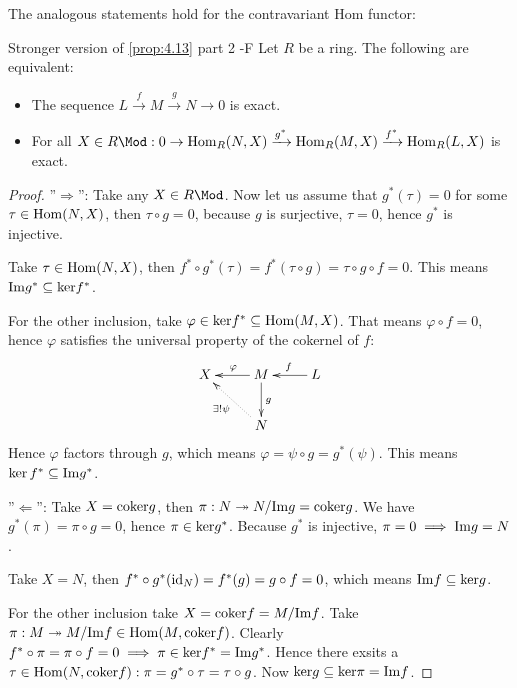 \documentclass[twoside = false,	%
		headsepline,		%
		parskip = true,
		]{scrbook}						%
\begin{document}
        The analogous statements hold for the contravariant Hom functor:
        \begin{proposition*}{Stronger version of \ref{prop:4.13} part 2 -F}
            Let $R$ be a ring. The following are equivalent:
            \begin{itemize}
                \item The sequence $L \xrightarrow{f} M \xrightarrow{g} N \to 0$ is exact.
                \item For all $X \in R \Mod: 0 \to \Hom_R(N,X) \xrightarrow{g^*} \Hom_R(M,X) \xrightarrow{f^*} \Hom_R(L,X)$ is exact.
            \end{itemize}
        \end{proposition*}

        \begin{proof}
        ''$\Rightarrow$'': Take any $X \in R\Mod$. Now let us assume that $g^*(\tau) = 0$ for some $\tau \in \mathrm{Hom}(N,X)$,
        then $\tau \circ g = 0$, because $g$ is surjective, $\tau = 0$, hence $g^*$ is injective.

        Take $\tau \in \mathrm{Hom}(N,X)$, then $f^* \circ g^* (\tau) = f^*(\tau \circ g) = \tau \circ g \circ f = 0$.
        This means $\mathrm{Im} g^* \subseteq \mathrm{ker} f^*$.

        For the other inclusion, take $\varphi \in \mathrm{ker} f^* \subseteq \mathrm{Hom}(M,X)$. That means $\varphi \circ f = 0$,
        hence $\varphi$ satisfies the universal property of the cokernel of $f$:
        \begin{equation*}
        \xymatrix {
            X & M \ar[l]_{\varphi} \ar[d]^{g} & \ar[l]_{f} L \\
            & N \ar@{.>}[ul]^{\exists ! \psi} & 
        }
        \end{equation*}
        Hence $\varphi$ factors through $g$, which means $\varphi = \psi \circ g = g^*(\psi)$.
        This means $\ker f^* \subseteq \mathrm{Im} g^* $.

        ''$\Leftarrow$'': Take $X = \mathrm{coker} g$, then $\pi: N \twoheadrightarrow N/\mathrm{Im} g = \mathrm{coker} g$.
        We have $g^*(\pi) = \pi \circ g = 0$, hence $\pi \in \mathrm{ker} g^* $.
        Because $g^*$ is injective, $\pi = 0 \implies \mathrm{Im} g = N$.

        Take $X = N$, then $f^* \circ g^* (\mathrm{id}_N) = f^* (g) = g \circ f = 0$,
        which means $\mathrm{Im} f \subseteq \mathrm{ker} g$.

        For the other inclusion take $X = \mathrm{coker} f = M/\mathrm{Im} f$. Take $\pi: M \twoheadrightarrow M/\mathrm{Im} f \in \mathrm{Hom}(M,\mathrm{coker} f)$.
        Clearly $f^* \circ \pi = \pi \circ f = 0 \implies \pi \in \mathrm{ker} f^* = \mathrm{Im} g^*$. Hence there exsits a $\tau \in \mathrm{Hom}(N,\mathrm{coker} f): \pi = g^* \circ \tau = \tau \circ g$.
        Now $\mathrm{ker} g \subseteq \mathrm{ker} \pi  = \mathrm{Im} f $. 
    \end{proof}
\end{document}
